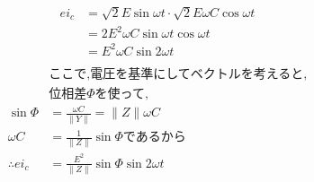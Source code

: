 \documentclass[twocolumn]{article}
\begin{document}
\begin{enumerate}
\begin{align*}
        ei_c  &= \sqrt{2}E\sin\omega t \cdot \sqrt{2}E \omega C  \cos\omega t\\
              &= 2E^2 \omega C \sin\omega t \cos\omega t\\
              &= E^2 \omega C \sin2\omega t\\
        \end{align*}
        \begin{align*}
            &\text{ここで,電圧を基準にしてベクトルを考えると,}\\
            &\text{位相差}\Phi\text{を使って,}\\
            \sin \Phi &= \frac{\omega C}{\|Y\|} = \|Z\|\omega C\\
            \omega C &= \frac{1}{\|Z\|} \sin \Phi\text{であるから}\\
\therefore ei_c &= \frac{E^2}{\|Z\|} \sin\Phi \sin2\omega t\\
        \end{align*}


\end{enumerate}
\end{document}
